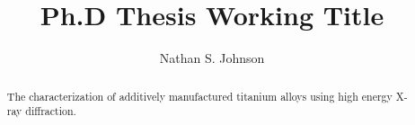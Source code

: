 \documentclass[letterpaper,12pt]{article}
\title{Ph.D Thesis Working Title}
\author{Nathan S. Johnson}
\begin{document}


\frontmatter


\maketitle
\newpage


\makecopyright{\the\year}
\newpage


\makesubmittal
\newpage


\begin{abstract}

The characterization of additively manufactured titanium alloys using high energy X-ray diffraction.

\end{abstract}

\newpage


\tableofcontents
\newpage


\listoffiguresandtables
\newpage




\end{document}
